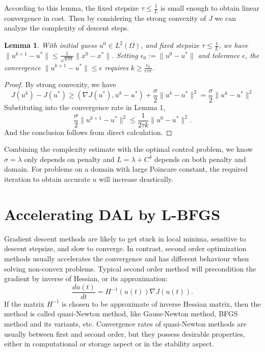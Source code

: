 \documentclass{article}
\newtheorem{lemma}[theorem]{Lemma}
\begin{document}
According to this lemma, the fixed stepsize $\tau\leq \frac{1}{L}$ is small enough to obtain linear convergence in cost. Then by considering the strong convexity of $J$ we can analyze the complexity of descent steps.

\begin{lemma}
    With initial guess $u^0\in L^2(\Omega)$, and fixed stepsize $\tau\leq\frac{1}{L}$, we have $\|u^{k+1}-u^*\|\leq \frac{1}{\sqrt{k\tau\sigma}}\|x^0-x^*\|$. Setting $\epsilon_0:=\|u^0-u^*\|$ and tolerance $\epsilon$, the convergence $\|u^{k+1}-u^*\|\leq \epsilon$ requires $k\geq \frac{\epsilon_0}{\epsilon \tau \sigma}$.
\end{lemma}
\begin{proof}
    By strong convexity, we have 
    \[
        J(u^k)-J(u^*)\geq (\nabla J(u^*),u^k-u^*)+\frac{\sigma}{2}\|u^k-u^*\|^2=\frac{\sigma}{2}\|u^k-u^*\|^2
    \]
    Substituting into the convergence rate in Lemma 1, 
    \[
        \frac{\sigma}{2}\|u^{k+1}-u^*\|^2\leq \frac{1}{2\tau k}\|u^0-u^*\|^2.
    \]
    And the conclusion follows from direct calculation.
\end{proof}

Combining the complexity estimate with the optimal control problem, we know $\sigma=\lambda$ only depends on penalty and $L=\lambda +C^4$ depends on both penalty and domain. For problems on a domain with large Poincare constant, the required iteration to obtain accurate $u$ will increase drastically.


\section{Accelerating DAL by L-BFGS}
Gradient descent methods are likely to get stuck in local minima, sensitive to descent stepsize, and slow to converge. In contrast, second order optimization methods usually accelerates the convergence and has different behaviour when solving non-convex problems. Typical second order method will precondition the gradient by inverse of Hessian, or its approximation:
\[
    \frac{du(t)}{dt}=H^{-1}(u(t))\nabla J(u(t)).
\]
If the matrix $H^{-1}$ is chosen to be approximate of inverse Hessian matrix, then the method is called quasi-Newton method, like Gauss-Newton method, BFGS method and its variants, etc. Convergence rates of quasi-Newton methods are usually between first and second order, but they possess desirable properties, either in computational or storage aspect or in the stability aspect. 
\end{document}
